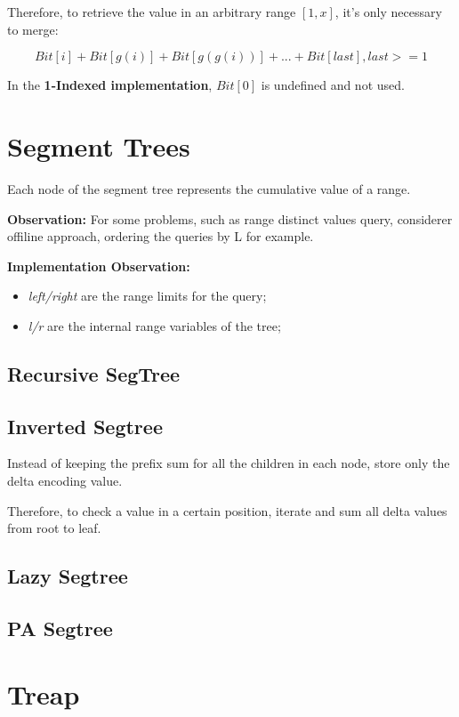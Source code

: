     Therefore, to retrieve the value in an arbitrary range $[1, x]$, it's only necessary to merge:

        $$ Bit[i] + Bit[g(i)] + Bit[g(g(i))] + ... + Bit[last], last >= 1$$

    In the \textbf{1-Indexed implementation}, $Bit[0]$ is undefined and not used.

    

\section{Segment Trees}

    Each node of the segment tree represents the cumulative value of a range.

    \textbf{Observation:} For some problems, such as range distinct values query,
    considerer offiline approach, ordering the queries by L for example. 

    \textbf{Implementation Observation:}
    \begin{itemize}
    \item \textit{left/right} are the range limits for the query;
    \item \textit{l/r} are the internal range variables of the tree;
    \end{itemize}

    \subsection{Recursive SegTree}



    \subsection{Inverted Segtree}

        Instead of keeping the prefix sum for all the children in each node, store only the delta encoding value.

        Therefore, to check a value in a certain position, iterate and sum all delta values from root to leaf.


    \subsection{Lazy Segtree}


    \subsection{PA Segtree}


\section{Treap}

